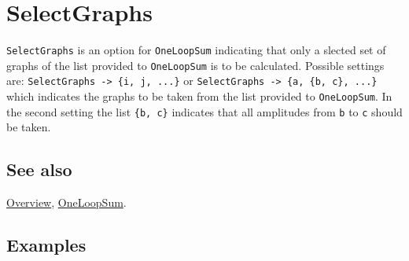 \documentclass[../FeynCalcManual.tex]{subfiles}
\begin{document}
\hypertarget{selectgraphs}{
\section{SelectGraphs}\label{selectgraphs}}

\texttt{SelectGraphs} is an option for \texttt{OneLoopSum} indicating
that only a slected set of graphs of the list provided to
\texttt{OneLoopSum} is to be calculated. Possible settings are:
\texttt{SelectGraphs -> \{\allowbreak{}i,\ \allowbreak{}j,\ \allowbreak{}...\}}
or
\texttt{SelectGraphs -> \{\allowbreak{}a,\ \allowbreak{}\{\allowbreak{}b,\ \allowbreak{}c\},\ \allowbreak{}...\}}
which indicates the graphs to be taken from the list provided to
\texttt{OneLoopSum}. In the second setting the list
\texttt{\{\allowbreak{}b,\ \allowbreak{}c\}} indicates that all
amplitudes from \texttt{b} to \texttt{c} should be taken.

\subsection{See also}

\hyperlink{toc}{Overview}, \hyperlink{oneloopsum}{OneLoopSum}.

\subsection{Examples}
\end{document}
